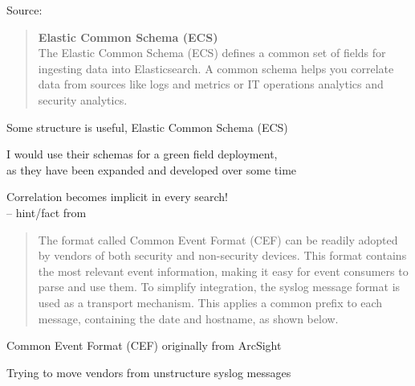 \documentclass[Screen16to9,17pt]{foils}
\begin{document}

Source: 






\begin{quote}{\bf
Elastic Common Schema (ECS)}\\
The Elastic Common Schema (ECS) defines a common set of fields for ingesting data into Elasticsearch. A common schema helps you correlate data from sources like logs and metrics or IT operations analytics and security analytics.
\end{quote}

\begin{list2}

\item Some structure is useful, Elastic Common Schema (ECS)\\
\item I would use their schemas for a green field deployment,\\
  as they have been expanded and developed over some time
\item Correlation becomes implicit in every search!\\
-- hint/fact from {\small{}}
\end{list2}




\begin{quote}
  The format called Common Event Format (CEF) can be readily adopted by
  vendors of both security and non-security devices. This format contains the
  most relevant event information, making it easy for event consumers to parse
  and use them.
  To simplify integration, the syslog message format is used as a transport
  mechanism. This applies a common prefix to each message, containing the
  date and hostname, as shown below.
\end{quote}

\begin{list2}
\item Common Event Format (CEF) originally from ArcSight
\item Trying to move vendors from unstructure syslog messages
\item {}
\end{list2}
\end{document}
